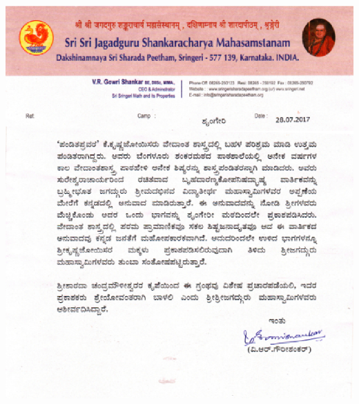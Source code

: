 \newpage
~\thispagestyle{empty}
\newpage
\begin{center}
\vfill
\thispagestyle{empty}
\includegraphics{figures/srimukha.eps}\\
\vfill
\end{center}

